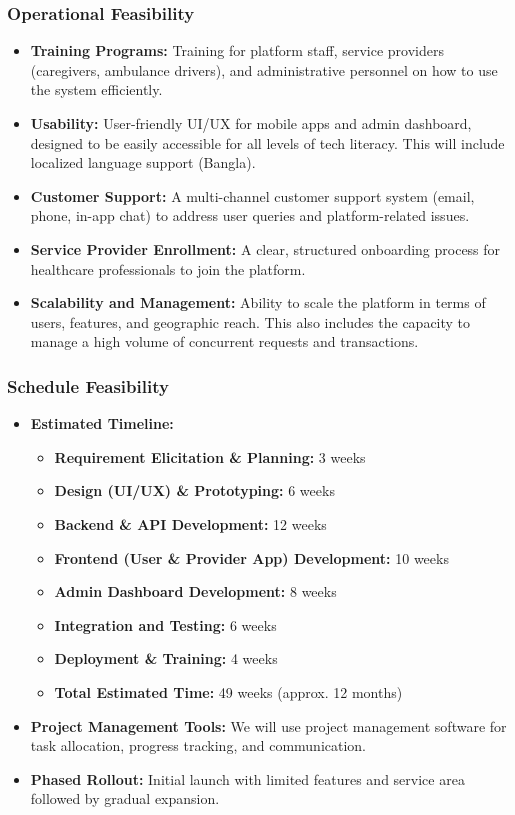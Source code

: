 \documentclass[12pt]{article}
\begin{document}
\subsubsection{Operational Feasibility}
\begin{itemize}
    \item \textbf{Training Programs:} Training for platform staff, service providers (caregivers, ambulance drivers), and administrative personnel on how to use the system efficiently.
     \item \textbf{Usability:} User-friendly UI/UX for mobile apps and admin dashboard, designed to be easily accessible for all levels of tech literacy. This will include localized language support (Bangla).
      \item \textbf{Customer Support:} A multi-channel customer support system (email, phone, in-app chat) to address user queries and platform-related issues.
       \item \textbf{Service Provider Enrollment:} A clear, structured onboarding process for healthcare professionals to join the platform.
        \item \textbf{Scalability and Management:} Ability to scale the platform in terms of users, features, and geographic reach. This also includes the capacity to manage a high volume of concurrent requests and transactions.
\end{itemize}

\subsubsection{Schedule Feasibility}
\begin{itemize}
   \item \textbf{Estimated Timeline:}
    \begin{itemize}
     \item \textbf{Requirement Elicitation \& Planning:} 3 weeks
    \item \textbf{Design (UI/UX) \& Prototyping:} 6 weeks
    \item \textbf{Backend \& API Development:} 12 weeks
    \item \textbf{Frontend (User \& Provider App) Development:} 10 weeks
     \item \textbf{Admin Dashboard Development:} 8 weeks
        \item \textbf{Integration and Testing:} 6 weeks
        \item \textbf{Deployment \& Training:} 4 weeks
        \item \textbf{Total Estimated Time:} 49 weeks (approx. 12 months)
    \end{itemize}
    \item \textbf{Project Management Tools:} We will use project management software for task allocation, progress tracking, and communication.
     \item \textbf{Phased Rollout:} Initial launch with limited features and service area followed by gradual expansion.
\end{itemize}
\end{document}
